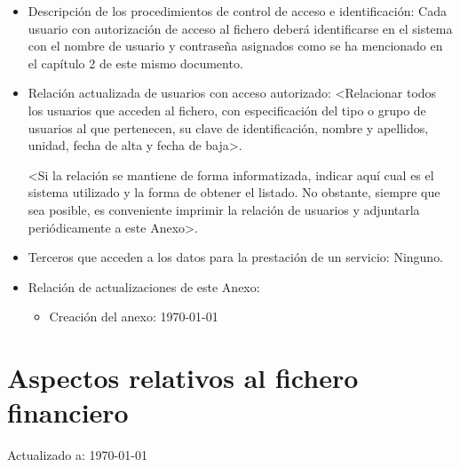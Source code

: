 \documentclass[a4paper,11pt,bibtotoc,noliststotoc]{scrbook}
\begin{document}
\begin{itemize}
\item Descripción de los procedimientos de control de acceso e identificación: Cada usuario con autorización de acceso al fichero deberá identificarse en el sistema con el nombre de usuario y contraseña asignados como se ha mencionado en el capítulo 2 de este mismo documento.

\item Relación actualizada de usuarios con acceso autorizado: <Relacionar todos los usuarios que acceden al fichero, con especificación del tipo o grupo de usuarios al que pertenecen, su clave de identificación, nombre y apellidos, unidad, fecha de alta y fecha de baja>.

<Si la relación se mantiene de forma informatizada, indicar aquí cual es el sistema utilizado y la forma de obtener el listado. No obstante, siempre que sea posible, es conveniente imprimir la relación de usuarios y adjuntarla periódicamente a este Anexo>.

\item Terceros que acceden a los datos para la prestación de un servicio: Ninguno.


\item Relación de actualizaciones de este Anexo: 

	\begin{itemize}
	\item Creación del anexo: \today
	\end{itemize}

\end{itemize}







\section{Aspectos relativos al fichero financiero}


Actualizado a: \today
\end{document}
